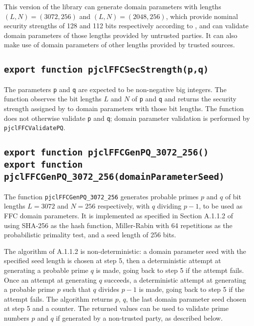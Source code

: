 \documentclass[12pt]{article}
\begin{document}
This version of the library can generate domain parameters with lengths
$(L,N) = (3072,256)$ and  $(L,N) = (2048,256)$,
which provide nominal security strengths of 128 and 112 bits respectively according to 
\cite[Table~2]{sp800-57part1rev4}, and can validate domain parameters of those lengths
provided by untrusted parties.  It can also make use of domain parameters of other lengths
provided by trusted sources.

\subsection{\tt export function pjclFFCSecStrength(p,q)}

The parameters {\tt p} and {\tt q} are expected to be non-negative big integers.
The function observes the bit lengths $L$ and $N$ of {\tt p} and {\tt q} and returns 
the security strength assigned by \cite[Table~2]{sp800-57part1rev4} to domain
parameters with those bit lengths.  The function does not otherwise validate {\tt p}
and {\tt q}; domain parameter validation is performed by 
{\tt pjclFFCValidatePQ}.

\subsection{\tt export function pjclFFCGenPQ\_3072\_256()\\export function pjclFFCGenPQ\_3072\_256(domainParameterSeed)}

The function {\tt pjclFFCGenPQ\_3072\_256} generates probable primes $p$ and $q$
of bit lengths $L = 3072$ and $N = 256$ respectively, with $q$
dividing $p-1$, to be used as FFC domain parameters.
It is implemented as specified in Section A.1.1.2 of \cite{DSS-4} using
SHA-256 as the hash function, Miller-Rabin with 64 repetitions as the
probabilistic primality test, and a seed length of 256 bits.

The algorithm of A.1.1.2 is non-deterministic: a domain parameter seed
with the specified seed length is chosen at step 5, then a
deterministic attempt at generating a probable prime $q$ is made,
going back to step 5 if the attempt fails.  Once an attempt at
generating $q$ succeeds, a deterministic attempt at generating a
probable prime $p$ such that $q$ divides $p-1$ is made, going back to
step 5 if the attempt fails.  The algorithm returns $p$, $q$, the last
domain parameter seed chosen at step 5 and a counter.  The returned
values can be used to validate prime numbers $p$
and $q$ if generated by a non-trusted party, as described below.
\end{document}
